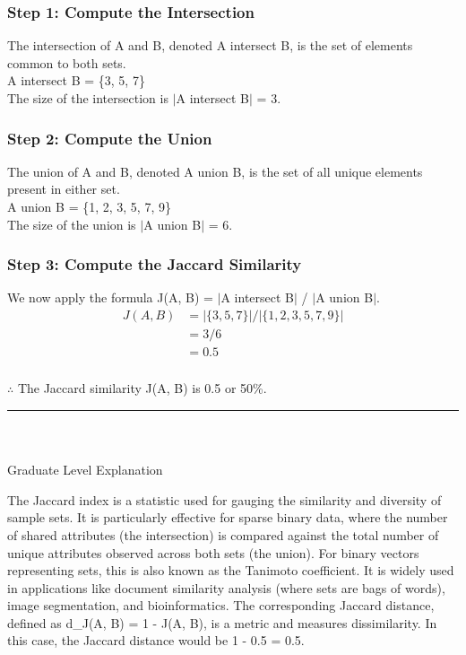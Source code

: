 \documentclass{article}
\begin{document}
\subsubsection*{Step 1: Compute the Intersection}
\parbox{\textwidth}{
The intersection of A and B, denoted A intersect B, is the set of elements common to both sets.
\\
A intersect B = \{3, 5, 7\}
\\
The size of the intersection is $|$A intersect B$|$ = 3.
}

\subsubsection*{Step 2: Compute the Union}
\parbox{\textwidth}{
The union of A and B, denoted A union B, is the set of all unique elements present in either set.
\\
A union B = \{1, 2, 3, 5, 7, 9\}
\\
The size of the union is $|$A union B$|$ = 6.
}

\subsubsection*{Step 3: Compute the Jaccard Similarity}
\parbox{\textwidth}{
We now apply the formula J(A, B) = $|$A intersect B$|$ / $|$A union B$|$.
\begin{align*}
    J(A, B) &= |\{3, 5, 7\}| / |\{1, 2, 3, 5, 7, 9\}| \\
            &= 3 / 6 \\
            &= 0.5
\end{align*}
}

\subsubsection*{\normalfont}{$\therefore$ The Jaccard similarity J(A, B) is 0.5 or 50\%.}

\noindent\rule{\textwidth}{0.4pt}\\

\newpage

\subsubsection*{\normalfont}{Graduate Level Explanation}

\parbox{\textwidth}{
The Jaccard index is a statistic used for gauging the similarity and diversity of sample sets. It is particularly effective for sparse binary data, where the number of shared attributes (the intersection) is compared against the total number of unique attributes observed across both sets (the union). For binary vectors representing sets, this is also known as the Tanimoto coefficient. It is widely used in applications like document similarity analysis (where sets are bags of words), image segmentation, and bioinformatics. The corresponding Jaccard distance, defined as d\_J(A, B) = 1 - J(A, B), is a metric and measures dissimilarity. In this case, the Jaccard distance would be 1 - 0.5 = 0.5.
}
\end{document}
